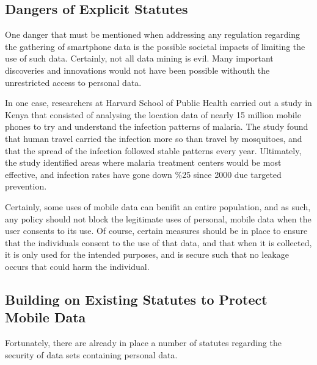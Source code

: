 	\subsection{Dangers of Explicit Statutes} 

One danger that must be mentioned when addressing any regulation regarding the gathering of smartphone data is the possible societal impacts of limiting the use of such data. Certainly, not all data mining is evil. Many important discoveries and innovations would not have been possible withouth the unrestricted access to personal data. 

In one case, researchers at Harvard School of Public Health carried out a study in Kenya that consisted of analysing the location data of nearly 15 million mobile phones to try and understand the infection patterns of malaria\cite{unlock}. The study found that human travel carried the infection more so than travel by mosquitoes, and that the spread of the infection followed stable patterns every year. Ultimately, the study identified areas where malaria treatment centers would be most effective, and infection rates have gone down \%25 since 2000 due targeted prevention. 

Certainly, some uses of mobile data can benifit an entire population, and as such, any policy should not block the legitimate uses of personal, mobile data when the user consents to its use. Of course, certain measures should be in place to ensure that the individuals consent to the use of that data, and that when it is collected, it is only used for the intended purposes, and is secure such that no leakage occurs that could harm the individual. 


	\subsection{Building on Existing Statutes to Protect Mobile Data}

Fortunately, there are already in place a number of statutes regarding the security of data sets containing personal data. 


